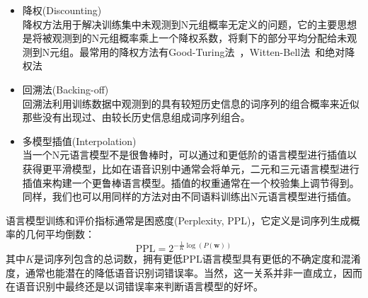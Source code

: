 \begin{itemize}
    \item 降权(Discounting) \\
    降权方法用于解决训练集中未观测到N元组概率无定义的问题，它的主要思想是将被观测到的N元组概率乘上一个降权系数，将剩下的部分平均分配给未观测到N元组。最常用的降权方法有Good-Turing法~\cite{good1953population,katz1987estimation}，Witten-Bell法~\cite{witten1991zero}和绝对降权法~\cite{ney1995estimation}
    \item 回溯法(Backing-off) \\
    回溯法利用训练数据中观测到的具有较短历史信息的词序列的组合概率来近似那些没有出现过、由较长历史信息组成词序列组合。
    \item 多模型插值(Interpolation) \\
    当一个N元语言模型不是很鲁棒时，可以通过和更低阶的语言模型进行插值以获得更平滑模型，比如在语音识别中通常会将单元，二元和三元语言模型进行插值来构建一个更鲁棒语言模型。插值的权重通常在一个校验集上调节得到。同样，我们也可以用同样的方法对由不同语料训练出N元语言模型进行插值。
\end{itemize}
语言模型训练和评价指标通常是困惑度(Perplexity, PPL)，它定义是词序列生成概率的几何平均倒数：
\begin{equation}
    \text{PPL}=2^{-\frac{1}{K}\log(P(\mathbf{w}))}
\end{equation}
其中$K$是词序列包含的总词数，拥有更低PPL语言模型具有更低的不确定度和混淆度，通常也能潜在的降低语音识别词错误率。当然，这一关系并非一直成立，因而在语音识别中最终还是以词错误率来判断语言模型的好坏。

